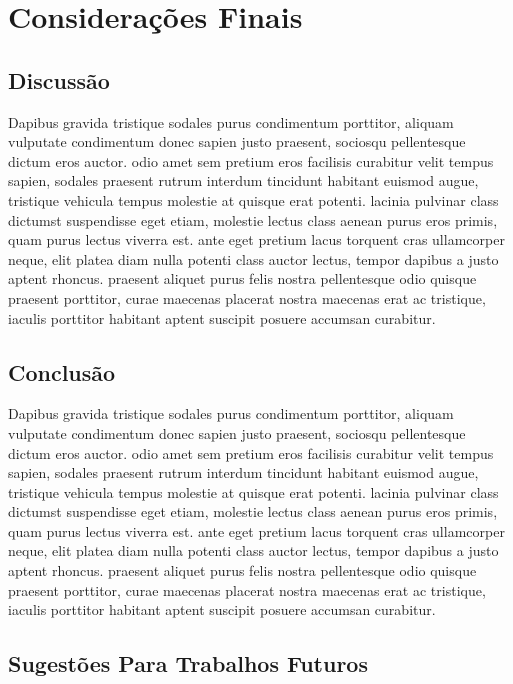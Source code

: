 \chapter{Considerações Finais}      \label{Consideracoes Finais}

\section{Discussão}

Dapibus gravida tristique sodales purus condimentum porttitor, aliquam vulputate condimentum donec sapien justo praesent, sociosqu pellentesque dictum eros auctor. odio amet sem pretium eros facilisis curabitur velit tempus sapien, sodales praesent rutrum interdum tincidunt habitant euismod augue, tristique vehicula tempus molestie at quisque erat potenti. lacinia pulvinar class dictumst suspendisse eget etiam, molestie lectus class aenean purus eros primis, quam purus lectus viverra est. ante eget pretium lacus torquent cras ullamcorper neque, elit platea diam nulla potenti class auctor lectus, tempor dapibus a justo aptent rhoncus. praesent aliquet purus felis nostra pellentesque odio quisque praesent porttitor, curae maecenas placerat nostra maecenas erat ac tristique, iaculis porttitor habitant aptent suscipit posuere accumsan curabitur. 

\section{Conclusão}

Dapibus gravida tristique sodales purus condimentum porttitor, aliquam vulputate condimentum donec sapien justo praesent, sociosqu pellentesque dictum eros auctor. odio amet sem pretium eros facilisis curabitur velit tempus sapien, sodales praesent rutrum interdum tincidunt habitant euismod augue, tristique vehicula tempus molestie at quisque erat potenti. lacinia pulvinar class dictumst suspendisse eget etiam, molestie lectus class aenean purus eros primis, quam purus lectus viverra est. ante eget pretium lacus torquent cras ullamcorper neque, elit platea diam nulla potenti class auctor lectus, tempor dapibus a justo aptent rhoncus. praesent aliquet purus felis nostra pellentesque odio quisque praesent porttitor, curae maecenas placerat nostra maecenas erat ac tristique, iaculis porttitor habitant aptent suscipit posuere accumsan curabitur.


\section{Sugestões Para Trabalhos Futuros}

